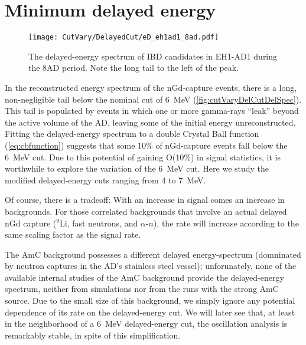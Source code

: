 \documentclass[../thesis.tex]{subfiles}
\begin{document}
\begin{comment}
XXX We'd hope that both the LBNL and IHEP points give closer results. We'll see when we regenerate. Ideally, we see that the LBNL and IHEP points both lie within a large region of minimally varying best-fit $\SinSq$. Curious about the effects of using BCW binning. We should do both, so 14x14x2 = 392 sel/fits.
\end{comment}
\section{Minimum delayed energy}
\label{sec:cutVaryMinDelayed}

\begin{figure}[ht]
  \texttt{[image: CutVary/DelayedCut/eD\_eh1ad1\_8ad.pdf]}
  \caption{The delayed-energy spectrum of IBD candidates in EH1-AD1 during the 8AD period. Note the long tail to the left of the peak.}
  \label{fig:cutVaryDelCutDelSpec}
\end{figure}

In the reconstructed energy spectrum of the nGd-capture events, there is a long, non-negligible tail below the nominal cut of 6~MeV (\autoref{fig:cutVaryDelCutDelSpec}). This tail is populated by events in which one or more gamma-rays ``leak'' beyond the active volume of the AD, leaving some of the initial energy unreconstructed. Fitting the delayed-energy spectrum to a double Crystal Ball function (\autoref{eq:cbfunction}) suggests that some 10\% of nGd-capture events fall below the 6~MeV cut. Due to this potential of gaining O(10\%) in signal statistics, it is worthwhile to explore the variation of the 6~MeV cut. Here we study the modified delayed-energy cuts ranging from 4 to 7~MeV.

Of course, there is a tradeoff: With an increase in signal comes an increase in backgrounds. For those correlated backgrounds that involve an actual delayed nGd capture ($^9$Li, fast neutrons, and $\alpha$-$n$), the rate will increase according to the same scaling factor as the signal rate.

The AmC background possesses a different delayed energy-spectrum (domninated by neutron captures in the AD's stainless steel vessel); unforunately, none of the available internal studies of the AmC background provide the delayed-energy spectrum, neither from simulations nor from the runs with the strong AmC source. Due to the small size of this background, we simply ignore any potential dependence of its rate on the delayed-energy cut. We will later see that, at least in the neighborhood of a 6~MeV delayed-energy cut, the oscillation analysis is remarkably stable, in spite of this simplification.
\end{document}
